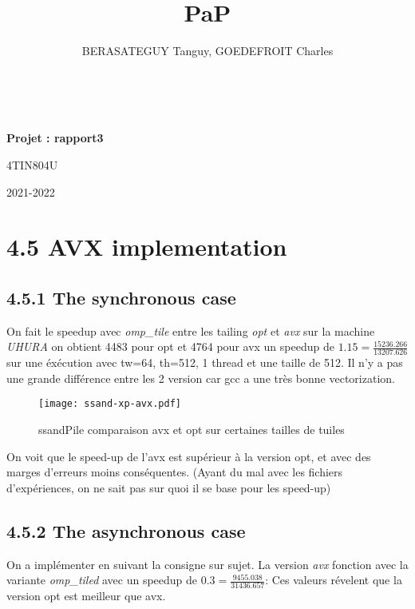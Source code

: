 \documentclass[10pt, a4paper]{article}
\title{PaP}
\author{BERASATEGUY Tanguy, GOEDEFROIT Charles}
\begin{document}
\begin{titlepage}
  \centering
  \ {} %
  \vfill
  \vspace{1cm}
  {\scshape\LARGE\MyTitle\par}
  \vspace{0.5cm}
  {\huge\bfseries Projet : rapport3\par}
  \vspace{0.5cm}
  {\Large 4TIN804U\par}
  \vspace{1cm}
  \MyAuthor
  \vfill
  {\large2021-2022\par}
\end{titlepage}

\newpage

\tableofcontents

\newpage

\section{4.5 AVX implementation}

\subsection{4.5.1 The synchronous case}

On fait le speedup avec \emph{omp\_tile} entre les tailing \emph{opt} et \emph{avx} sur la machine
\emph{UHURA} on obtient 4483 pour opt et 4764 pour avx un speedup de $1.15 =\frac{15236.266}{13207.626}$
sur une éxécution avec tw=64, th=512, 1 thread et une taille de 512.
Il n'y a pas une grande différence entre les 2 version car gcc a une très bonne vectorization.

\begin{figure}[H]
  \centering
  \texttt{[image: ssand-xp-avx.pdf]}
  \caption{\small{ssandPile comparaison avx et opt sur certaines tailles de tuiles}}
\end{figure}

On voit que le speed-up de l'avx est supérieur à la version opt, et avec des marges d'erreurs
moins conséquentes.
(Ayant du mal avec les fichiers d'expériences, on ne sait pas sur quoi il se base pour les speed-up)

\subsection{4.5.2 The asynchronous case}

On a implémenter en suivant la consigne sur sujet.
La version \emph{avx} fonction avec la variante \emph{omp\_tiled} avec un speedup de $0.3 =\frac{9455.038}{31436.657}$:
Ces valeurs révelent que la version opt est meilleur que avx.
\end{document}
